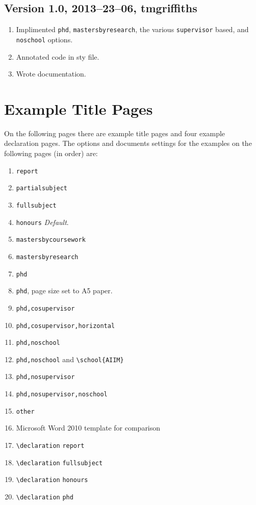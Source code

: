 \documentclass[12pt,oneside]{article}
\newcommand{\option}[1]{\texttt{\color{Green}#1}} %
\newcommand{\command}[1]{\texttt{\color{Red}#1}} %
\newcommand{\comoptions}[1]{\texttt{\color{Blue}#1}} %
\begin{document}
\subsection*{Version 1.0, 2013–23–06, tmgriffiths}
\begin{enumerate}
    \item Implimented \option{phd}, \option{mastersbyresearch}, the various \option{supervisor} based, and \option{noschool} options.
    \item Annotated code in sty file.
    \item Wrote documentation.
\end{enumerate}

\clearpage
\section{Example Title Pages}
On the following pages there are example title pages and four example declaration pages. The options and documents settings for the examples on the following pages (in order) are:
\begin{enumerate}
    \item \option{report}
    \item \option{partialsubject}
    \item \option{fullsubject}
    \item \option{honours} \emph{Default}.
    \item \option{mastersbycoursework}
    \item \option{mastersbyresearch}
    \item \option{phd}
    \item \option{phd}, page size set to A5 paper.
    \item \option{phd,cosupervisor}
    \item \option{phd,cosupervisor,horizontal}
    \item \option{phd,noschool}
    \item \option{phd,noschool} and \command{\textbackslash{}school}\comoptions{\{AIIM\}}
    \item \option{phd,nosupervisor}
    \item \option{phd,nosupervisor,noschool}
    \item \option{other}
    \item Microsoft Word 2010 template for comparison
    \item \command{\textbackslash{}declaration} \option{report}
    \item \command{\textbackslash{}declaration} \option{fullsubject}
    \item \command{\textbackslash{}declaration} \option{honours}
    \item \command{\textbackslash{}declaration} \option{phd}
\end{enumerate}
\end{document}

